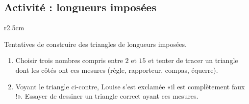 
\subsection*{Activité : longueurs imposées}

\begin{wrapfigure}[3]{r}{2.5cm}
   \vspace{-0.5cm}        %
   \centering
   
\end{wrapfigure}

Tentatives de construire des triangles de longueurs imposées.

\begin{enumerate}
    \item
        
Choisir trois nombres compris entre $2$ et $15$ et tenter de tracer un triangle dont les côtés ont ces mesures (règle, rapporteur, compas, équerre).

\item

    Voyant le triangle ci-contre, Louise s'est exclamée «il est complètement faux !». Essayer de dessiner un triangle correct ayant ces mesures.

\end{enumerate}
